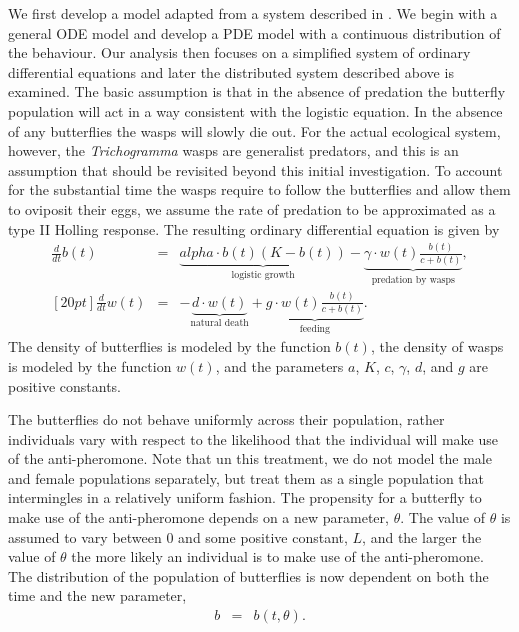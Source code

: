 \documentclass[review,authoryear]{elsarticle}
\def\alpha{alpha}%
\newcommand{\origB}{{b}}
\newcommand{\origW}{{w}}
\newcommand{\origAlpha}{{\alpha}}
\newcommand{\origK}{{K}}
\newcommand{\origGamma}{{\gamma}}
\newcommand{\origA}{{a}}
\newcommand{\origC}{{c}}
\newcommand{\origD}{{d}}
\newcommand{\origG}{{g}}
\newcommand{\origL}{{L}}
\newcommand{\origTheta}{{\theta}}
\newcommand{\origT}{{t}}
\begin{document}
We first develop a model adapted from a system described in \cite{TEWA20134825}. We begin with a general ODE model and develop a PDE model with a continuous distribution of the behaviour. Our analysis then
focuses on a simplified system of ordinary differential
equations and later the distributed system described
above is examined. The basic assumption is that in the absence of predation the
butterfly population will act in a way consistent with the logistic
equation. In the absence of any butterflies the wasps will slowly die
out. For the actual ecological system, however, the \textit{Trichogramma}
wasps are generalist predators, and this is an assumption that should
be revisited beyond this initial investigation.  To account for the
substantial time the wasps require to follow the butterflies and allow
them to oviposit their eggs, we assume the rate of predation to be
approximated as a type II Holling response\citep{TEWA20134825,holling_1959A,holling_1959B}.  The
resulting ordinary differential equation is given by
\begin{eqnarray}
  \label{eq:initialSystem1}
  \frac{d}{d\origT} \origB(\origT) & = & \underbrace{\origAlpha \cdot \origB(\origT) (\origK - \origB(\origT))}_\text{logistic growth}
                               - \underbrace{\origGamma \cdot \origW(\origT) \frac{\origB(\origT)}{\origC+\origB(\origT)}}_\text{predation by wasps}, \\ [20pt]
  \label{eq:initialSystem2}
  \frac{d}{d\origT} \origW(\origT) & = & -\underbrace{\origD \cdot \origW(\origT)}_\text{natural death} + \underbrace{\origG \cdot \origW(\origT) \frac{\origB(\origT)}{\origC+\origB(\origT)}}_\text{feeding}.
\end{eqnarray}
The density of butterflies is modeled by the function
$\origB(\origT)$, the density of wasps is modeled by the function
$\origW(\origT)$, and the parameters $\origA$, $\origK$, $\origC$,
$\origGamma$, $\origD$, and $\origG$ are positive constants. 
 
The butterflies do not behave uniformly across their population, rather individuals vary with respect to the likelihood that the individual will make use of the anti-pheromone. 
Note that un this treatment, we do not model the male and female populations separately, but treat
them as a single population that intermingles in a relatively uniform
fashion. The propensity for a butterfly to make use of the
anti-pheromone depends on a new parameter, $\origTheta$. The value of
$\origTheta$ is assumed to vary between $0$ and some positive constant,
$\origL$, and the larger the value of $\origTheta$ the more likely an
individual is to make use of the anti-pheromone. The distribution of
the population of butterflies is now dependent on both the time and
the new parameter,
\begin{eqnarray}
  \origB & = & \origB(\origT,\origTheta).
\end{eqnarray}
\end{document}
